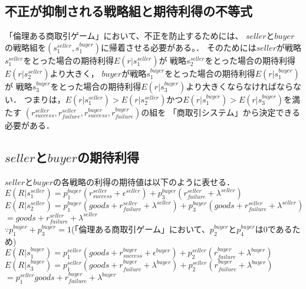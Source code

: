 \subsection{不正が抑制される戦略組と期待利得の不等式}
「倫理ある商取引ゲーム」において、不正を防止するためには、
$seller$と$buyer$の戦略組を$(s^{seller}_1, s^{buyer}_1)$に帰着させる必要がある。．
そのためには$seller$が戦略$s^{seller}_1$をとった場合の期待利得$E(r|s^{seller}_1)$が
戦略$s^{seller}_2$をとった場合の期待利得$E(r|s^{seller}_2)$より大きく，
$buyer$が戦略$s^{buyer}_1$をとった場合の期待利得$E(r|s^{buyer}_1)$が
戦略$s^{buyer}_3$をとった場合の期待利得$E(r|s^{buyer}_3)$より大きくならなければならない．
つまりは，$E(r|s^{seller}_1) > E(r|s^{seller}_2)$かつ$E(r|s^{buyer}_1) > E(r|s^{buyer}_3)$を満たす
$(r^{seller}_{success}, r^{seller}_{failure}, r^{buyer}_{success}, r^{buyer}_{failure})$の組を
「商取引システム」から決定できる必要がある．

\subsection{$ seller $と$ buyer $の期待利得}

$ seller $と$ buyer $の各戦略の利得の期待値は以下のように表せる．\\


$ E(R|s^{seller}_1) = p^{buyer}_1 (r^{seller}_{success} + \epsilon^{seller}) + p^{buyer}_3 (r^{seller}_{failure} + \lambda^{seller}) $ \\

$ E(R|s^{seller}_2) = p^{buyer}_1 (goods + r^{seller}_{failure} + \lambda^{seller}) + p^{buyer}_3 (goods + r^{seller}_{failure} + \lambda^{seller}) $ \\

$ = goods + r^{seller}_{failure} + \lambda^{seller} $ \\

$ \because p^{buyer}_1 + p^{buyer}_3 = 1 $(「倫理ある商取引ゲーム」において、$ p^{buyer}_2 $と$ p^{buyer}_4 $は0であるため) \\

$ E(R|s^{buyer}_1) = p^{seller}_1 (goods + r^{buyer}_{success} + \epsilon^{buyer}) + p^{seller}_2 (r^{buyer}_{failure} + \lambda^{buyer}) $ \\

$ E(R|s^{buyer}_3) = p^{seller}_1(goods+r^{buyer}_{failure} + \lambda^{buyer}) + p^{seller}_2 (r^{buyer}_{failure} + \lambda^{buyer}) $ \\

$ = p^{seller}_1 goods + r^{buyer}_{failure} + \lambda^{buyer} $ \\

